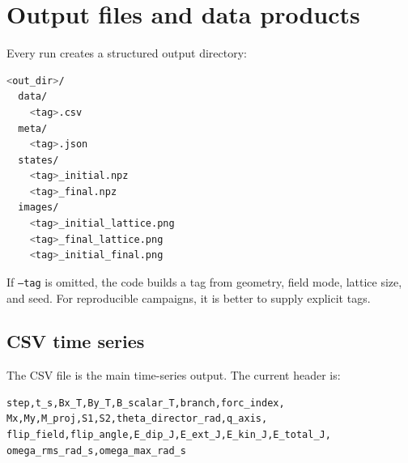 \documentclass[11pt,a4paper]{article}
\newcommand{\code}[1]{\texttt{#1}}
\begin{document}
\section{Output files and data products}
\label{sec:outputs}

Every run creates a structured output directory:

\begin{lstlisting}[language=bash]
<out_dir>/
  data/
    <tag>.csv
  meta/
    <tag>.json
  states/
    <tag>_initial.npz
    <tag>_final.npz
  images/
    <tag>_initial_lattice.png
    <tag>_final_lattice.png
    <tag>_initial_final.png
\end{lstlisting}

If \code{--tag} is omitted, the code builds a tag from geometry, field mode, lattice size, and seed. For reproducible campaigns, it is better to supply explicit tags.

\subsection{CSV time series}

The CSV file is the main time-series output. The current header is:

\begin{lstlisting}
step,t_s,Bx_T,By_T,B_scalar_T,branch,forc_index,
Mx,My,M_proj,S1,S2,theta_director_rad,q_axis,
flip_field,flip_angle,E_dip_J,E_ext_J,E_kin_J,E_total_J,
omega_rms_rad_s,omega_max_rad_s
\end{lstlisting}
\end{document}
